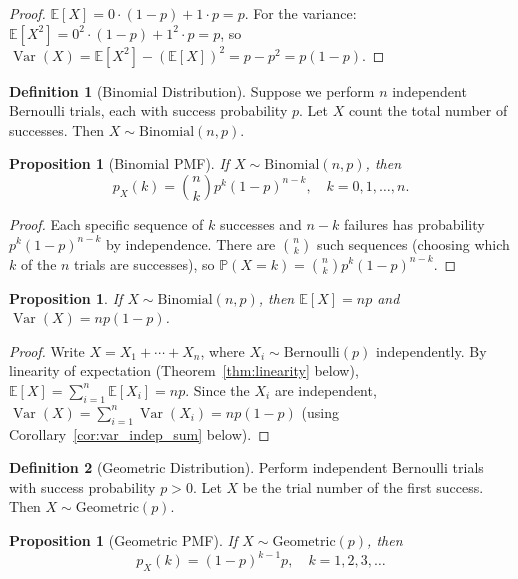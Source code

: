 \documentclass[11pt,a4paper]{article}
\theoremstyle{definition}
\newtheorem{definition}{Definition}[section]
\theoremstyle{plain}
\newtheorem{proposition}[theorem]{Proposition}
\theoremstyle{remark}
\newcommand{\E}{\mathbb{E}}
\newcommand{\Prob}{\mathbb{P}}
\DeclareMathOperator{\Var}{Var}
\begin{document}
\begin{proof}
$\E[X] = 0 \cdot (1-p) + 1 \cdot p = p$.
For the variance: $\E[X^2] = 0^2 \cdot (1-p) + 1^2 \cdot p = p$, so
$\Var(X) = \E[X^2] - (\E[X])^2 = p - p^2 = p(1-p)$.
\end{proof}

\begin{definition}[Binomial Distribution]
\label{def:binomial}
Suppose we perform $n$ independent Bernoulli trials, each with success probability $p$.
Let $X$ count the total number of successes. Then $X \sim \mathrm{Binomial}(n, p)$.
\end{definition}

\begin{proposition}[Binomial PMF]
\label{prop:binomial_pmf}
If $X \sim \mathrm{Binomial}(n, p)$, then
\[
    p_X(k) = \binom{n}{k} p^k (1-p)^{n-k}, \quad k = 0, 1, \ldots, n.
\]
\end{proposition}

\begin{proof}
Each specific sequence of $k$ successes and $n - k$ failures has probability
$p^k(1-p)^{n-k}$ by independence. There are $\binom{n}{k}$ such sequences (choosing which
$k$ of the $n$ trials are successes), so $\Prob(X = k) = \binom{n}{k} p^k(1-p)^{n-k}$.
\end{proof}

\begin{proposition}
\label{prop:binomial_moments}
If $X \sim \mathrm{Binomial}(n, p)$, then $\E[X] = np$ and $\Var(X) = np(1-p)$.
\end{proposition}

\begin{proof}
Write $X = X_1 + \cdots + X_n$, where $X_i \sim \mathrm{Bernoulli}(p)$ independently. By
linearity of expectation (Theorem~\ref{thm:linearity} below),
$\E[X] = \sum_{i=1}^n \E[X_i] = np$. Since the $X_i$ are independent, $\Var(X) =
\sum_{i=1}^n \Var(X_i) = np(1-p)$ (using Corollary~\ref{cor:var_indep_sum} below).
\end{proof}

\begin{definition}[Geometric Distribution]
\label{def:geometric}
Perform independent Bernoulli trials with success probability $p > 0$. Let $X$ be the trial
number of the first success. Then $X \sim \mathrm{Geometric}(p)$.
\end{definition}

\begin{proposition}[Geometric PMF]
\label{prop:geometric_pmf}
If $X \sim \mathrm{Geometric}(p)$, then
\[
    p_X(k) = (1-p)^{k-1} p, \quad k = 1, 2, 3, \ldots
\]
\end{proposition}
\end{document}
